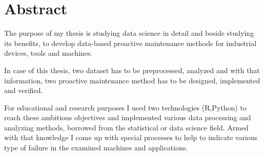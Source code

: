 \chapter*{Abstract}

The purpose of my thesis is studying data science in detail and beside studying its benefits, to develop data-based proactive maintenance methods for industrial devices, tools and machines.

In case of this thesis, two dataset has to be preprocessed, analyzed and with that information, two proactive maintenance method has to be designed, implemented and verified.

For educational and research purposes I used two technologies (R,Python) to reach these ambitious objectives and implemented various data processing and analyzing methods, borrowed from the statistical or data science field. Armed with that knowledge I come up with special processes to help to indicate various type of failure in the examined machines and applications.
